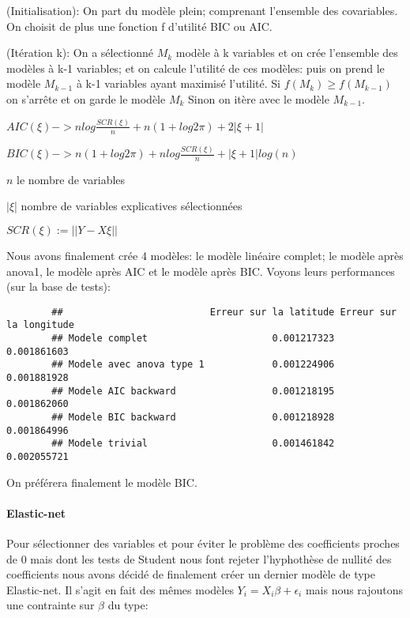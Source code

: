 \documentclass[french]{article}%
\begin{document}
		(Initialisation): On part du modèle plein; comprenant l'ensemble des covariables. On choisit de plus une fonction f d'utilité BIC ou AIC.
		
		(Itération k): On a sélectionné $M_{k}$ modèle à k variables et on crée l'ensemble des modèles à k-1 variables; et on calcule l'utilité de ces modèles: puis on prend le modèle $M_{k-1}$ à k-1 variables ayant maximisé l'utilité. 
		Si $f(M_{k})\ge f(M_{k-1})$ on s'arrête et on garde le modèle $M_{k}$
		Sinon on itère avec le modèle $M_{k-1}$.
		
		$AIC(\xi)->nlog\frac{SCR(\xi)}{n}+n(1+log2\pi)+2|\xi+1|$
		
		$BIC(\xi)->n(1+log2\pi)+nlog\frac{SCR(\xi)}{n}+|\xi+1|log (n)$
		
		$n$ le nombre de variables
		
		$|\xi$| nombre de variables explicatives sélectionnées
		
		$SCR(\xi):=||Y-X\xi||$
		
		Nous avons finalement crée 4 modèles: le modèle linéaire complet; le modèle après anova1, le modèle après AIC et le modèle après BIC. Voyons leurs performances (sur la base de tests):
		
		\begin{verbatim}
		##                          Erreur sur la latitude Erreur sur la longitude
		## Modele complet                      0.001217323             0.001861603
		## Modele avec anova type 1            0.001224906             0.001881928
		## Modele AIC backward                 0.001218195             0.001862060
		## Modele BIC backward                 0.001218928             0.001864996
		## Modele trivial                      0.001461842             0.002055721
		\end{verbatim}
		
		On préférera finalement le modèle BIC.
		
		\paragraph*{Elastic-net}
			
			Pour sélectionner des variables et pour éviter le problème des coefficients proches de 0 mais dont les tests de Student nous font rejeter l'hyphothèse de nullité des coefficients nous avons décidé de finalement créer un dernier modèle de type Elastic-net. Il s'agit en fait des mêmes modèles $Y_{i}=X_{i}\beta + \epsilon_{i}$ mais nous rajoutons une contrainte sur $\beta$ du type:
			
\end{document}
